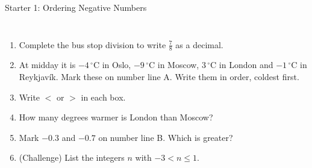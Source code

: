 \documentclass{beamer}
\newcommand{\ashow}[1]{\uncover<2->{\textcolor{red}{\small #1}}}
\newcommand{\abox}[1]{%
  \tikz[baseline=(b.base)]\node[draw=gray, densely dotted, inner sep=1.5pt] (b)
    {\alt<2->{\textcolor{red}{#1}}{\phantom{#1}}};%
}
\newcommand{\tightlist}{%
  \setlength{\itemsep}{0pt}\setlength{\parskip}{0pt}\setlength{\topsep}{0pt}%
}
\newcommand{\dC}[1]{$#1\,^{\circ}$C}
\begin{document}
\begin{frame}[t]{Starter 1: Ordering Negative Numbers}
\begin{columns}[T,onlytextwidth]
\vspace{-1.5em}
\footnotesize
\begin{enumerate}\tightlist
{}
  \item Complete the bus stop division to write $\frac78$ as a decimal.
        \ashow{$0.875$}
  \item At midday it is \dC{-4} in Oslo, \dC{-9} in Moscow, \dC{3} in London and
        \dC{-1} in Reykjavík. Mark these on number line A. Write them in order,
        coldest first.
        \ashow{$-9$, \; $-4$, \; $-1$, \; $3$}
  \item[] Write $<$ or $>$ in each box.
{\setlength{\columnsep}{14pt}%
}
  \item How many degrees warmer is London than Moscow?
        \ashow{$12$ degrees}
  \item Mark $-0.3$ and $-0.7$ on number line B. Which is greater?
        \ashow{$-0.3$, because it is further right}
  \item (Challenge) List the integers $n$ with $-3<n\leq1$.
        \ashow{$-2,\ -1,\ 0,\ 1$}
\end{enumerate}
\end{columns}
\end{frame}
\end{document}
